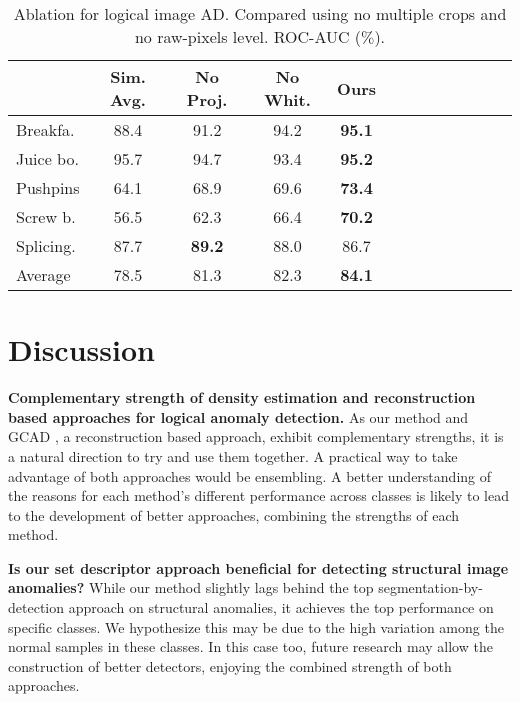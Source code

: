 \documentclass{article}
\begin{document}
\begin{table}
\caption{Ablation for logical image AD. Compared using no multiple crops and no  raw-pixels level. ROC-AUC  ($\%$).}
\centering
\small
\begin{tabular}{lcccccccccccc}
\toprule

	&	 Sim. Avg.	&	No Proj.	&	No Whit.	&	Ours	\\
  \toprule
Breakfa.	&	88.4	&	91.2	&	94.2	&	\textbf{95.1}	\\
Juice bo.	&	95.7	&	94.7	&	93.4	&	\textbf{95.2}	\\
Pushpins	&	64.1	&	68.9	&	69.6	&	\textbf{73.4}	\\
Screw b.	&	56.5	&	62.3	&	66.4	&	\textbf{70.2}	\\
Splicing.	&	87.7	&	\textbf{89.2}	&	88.0	&	86.7	\\
\midrule									
Average	&	78.5	&	81.3	&	82.3	&	\textbf{84.1}	\\



 
\bottomrule
\end{tabular}
\label{tab:abl_image_no_raw}
\end{table}

\section{Discussion} 
\label{sec:discussion}

\textbf{Complementary strength of density estimation and reconstruction based approaches for logical  anomaly detection.} As our method and GCAD \cite{bergmann2022beyond}, a reconstruction based approach, exhibit complementary strengths, it is a natural direction to try and use them together. A practical way to take advantage of both approaches would be ensembling. A better understanding of the reasons for each method's different performance across classes is likely to lead to the development of better approaches, combining the strengths of each method.

\textbf{Is our set descriptor approach beneficial for detecting structural image  anomalies?} While our method slightly lags behind the top segmentation-by-detection approach on structural anomalies, it achieves the top performance on specific classes. We hypothesize this may be due to the high variation among the normal samples in these classes. In this case too, future research may allow the construction of better detectors, enjoying the combined strength of both approaches.
\end{document}
